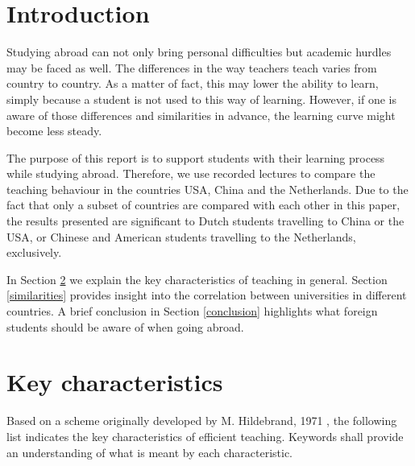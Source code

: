 \documentclass[journal]{IEEEtran}
\begin{document}
\section{Introduction}

Studying abroad can not only bring personal difficulties but academic hurdles may be faced as well.
The differences in the way teachers teach varies from country to country.
As a matter of fact, this may lower the ability to learn, simply because a student is not used to this way of learning.
However, if one is aware of those differences and similarities in advance, the learning curve might become less steady.

The purpose of this report is to support students with their learning process while studying abroad. 
Therefore, we use recorded lectures to compare the teaching behaviour in the countries USA, China and the Netherlands.
Due to the fact that only a subset of countries are compared with each other in this paper, the results presented are significant to Dutch students travelling to China or the USA, or Chinese and American students travelling to the Netherlands, exclusively. 

In Section \ref{characteristics} we explain the key characteristics of teaching in general. Section \ref{similarities} provides insight into the correlation between universities in different countries. A brief conclusion in Section \ref{conclusion} highlights what foreign students should be aware of when going abroad.

\section{Key characteristics}
\label{characteristics}

Based on a scheme originally developed by M. Hildebrand, 1971 \cite{hildebrand1971evaluating}, the following list indicates the key characteristics of efficient teaching. Keywords shall provide an understanding of what is meant by each characteristic.
\end{document}

